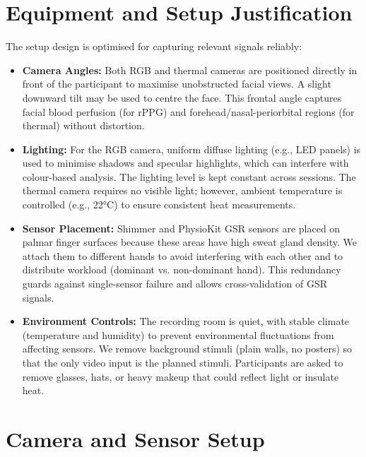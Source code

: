 \documentclass{article}
\begin{document}
\section{Equipment and Setup Justification}

The setup design is optimised for capturing relevant signals reliably:

\begin{itemize}
    \item \textbf{Camera Angles:} Both RGB and thermal cameras are positioned directly in front of the participant to maximise unobstructed facial views. A slight downward tilt may be used to centre the face. This frontal angle captures facial blood perfusion (for rPPG) and forehead/nasal-periorbital regions (for thermal) without distortion.
    \item \textbf{Lighting:} For the RGB camera, uniform diffuse lighting (e.g., LED panels) is used to minimise shadows and specular highlights, which can interfere with colour-based analysis. The lighting level is kept constant across sessions. The thermal camera requires no visible light; however, ambient temperature is controlled (e.g., 22°C) to ensure consistent heat measurements.
    \item \textbf{Sensor Placement:} Shimmer and PhysioKit GSR sensors are placed on palmar finger surfaces because these areas have high sweat gland density. We attach them to different hands to avoid interfering with each other and to distribute workload (dominant vs. non-dominant hand). This redundancy guards against single-sensor failure and allows cross-validation of GSR signals.
    \item \textbf{Environment Controls:} The recording room is quiet, with stable climate (temperature and humidity) to prevent environmental fluctuations from affecting sensors. We remove background stimuli (plain walls, no posters) so that the only video input is the planned stimuli. Participants are asked to remove glasses, hats, or heavy makeup that could reflect light or insulate heat.
\end{itemize}

\section{Camera and Sensor Setup}
\end{document}
